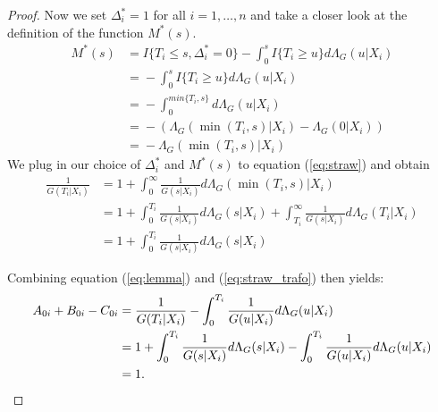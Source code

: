 \documentclass[12pt, a4paper]{scrartcl}
\theoremstyle{definition}
\theoremstyle{plain}
\numberwithin{equation}{section}
\numberwithin{figure}{section}
\numberwithin{table}{section}
\begin{document}
\begin{appendices}
\begin{proof}
			Now we set $ \Delta^*_i=1$ for all $i=1,\dots,n$ and take a closer look at the definition of the function $M^*(s)$.
			\begin{equation*}
			\begin{split}
			M^*(s) &={} I\{T_i \leq s, \Delta^*_i = 0\} - \int_{0}^s I\{T_i\geq u\}d\Lambda_G(u\vert X_i)\\
			& ={} - \int_{0}^s I\{T_i\geq u\}d\Lambda_G(u\vert X_i)\\
			& ={} - \int_0^{min\{T_i,s\}}d\Lambda_G(u\vert X_i)\\
			& ={} - \left(\Lambda_G(\min(T_i,s)\vert X_i)-\Lambda_G(0\vert X_i)\right)\\
			& ={} - \Lambda_G(\min(T_i,s)\vert X_i)
			\end{split}
			\end{equation*}
			We plug in our choice of $\Delta^*_i$ and $M^*(s)$ to equation (\ref{eq:straw}) and obtain
			\begin{equation}\label{eq:straw_trafo}
			\begin{split}
			\frac{1}{G(T_i\vert X_i)} &={} 1 + \int_{0}^{\infty} \frac{1}{G(s\vert X_i)} d\Lambda_G(\min(T_i,s)\vert X_i)\\
			&={} 1 + \int_{0}^{T_i} \frac{1}{G(s\vert X_i)} d\Lambda_G(s\vert X_i) + \int_{T_i}^{\infty} \frac{1}{G(s\vert X_i)} d\Lambda_G(T_i\vert X_i)\\
			& ={} 1 + \int_{0}^{T_i} \frac{1}{G(s\vert X_i)} d\Lambda_G(s\vert X_i)
			\end{split}
			\end{equation}
		
			Combining equation (\ref{eq:lemma}) and (\ref{eq:straw_trafo}) then yields:
			\begin{equation*}
			\begin{split}
			A_{0i}+B_{0i}-C_{0i}&={}\frac{1}{G(T_i \vert X_i)} - \int_{0}^{T_i}\frac{1}{G(u\vert X_i)}d\Lambda_G(u\vert X_i)\\
			&={} 1 + \int_{0}^{T_i} \frac{1}{G(s\vert X_i)} d\Lambda_G(s\vert X_i)  - \int_{0}^{T_i}\frac{1}{G(u\vert X_i)}d\Lambda_G(u\vert X_i)\\
			&={} 1. \qedhere
			\end{split}
			\end{equation*}
		\end{proof}
		\newpage

\end{appendices}
\end{document}
